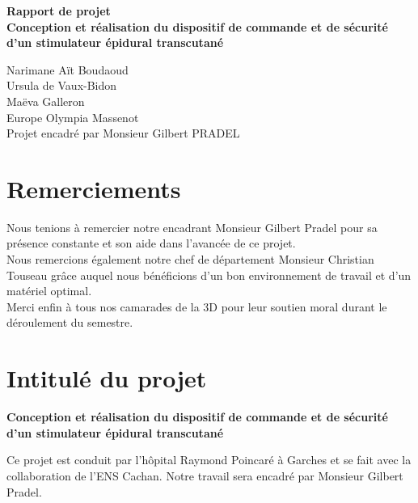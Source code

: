 \documentclass{report}
\begin{document}
\begin{titlepage}

\enlargethispage{2cm}



\begin{center}
\vspace*{5cm}
\Huge\bf{Rapport de projet} \\ 
\vspace*{1.5cm}
\LARGE{Conception et r\'{e}alisation du dispositif de commande et de s\'{e}curit\'{e} d'un stimulateur \'{e}pidural transcutan\'{e}}

\end{center}

\vspace*{7cm}
\begin{center}
\Large{Narimane A\"{i}t Boudaoud \\Ursula de Vaux-Bidon \\Ma\"{e}va Galleron \\Europe Olympia Massenot \\}
\vspace*{1cm}
\Large{Projet encadr\'{e} par Monsieur Gilbert PRADEL}
\end{center}

\end{titlepage}

\chapter*{Remerciements}
\large
Nous tenions \`{a} remercier notre encadrant Monsieur Gilbert Pradel pour sa pr\'{e}sence constante et son aide dans l'avanc\'{e}e de ce projet. \\
Nous remercions \'{e}galement notre chef de d\'{e}partement Monsieur Christian Touseau gr\^{a}ce auquel nous b\'{e}n\'{e}ficions d’un bon environnement de travail et d’un mat\'{e}riel optimal. \\
Merci enfin \`{a} tous nos camarades de la 3D pour leur soutien moral durant le d\'{e}roulement du semestre. 

\newpage

\tableofcontents

\newpage


\chapter*{Intitul\'{e} du projet}
\begin{center}
\textbf{Conception et r\'{e}alisation du dispositif de commande et de s\'{e}curit\'{e} d'un stimulateur \'{e}pidural transcutan\'{e}}
\vspace*{1cm}
\end{center}
Ce projet est conduit par l'h\^{o}pital Raymond Poincar\'{e} \`{a} Garches et se fait avec la collaboration de l'ENS Cachan. Notre travail sera encadr\'{e} par Monsieur Gilbert Pradel.
\end{document}
